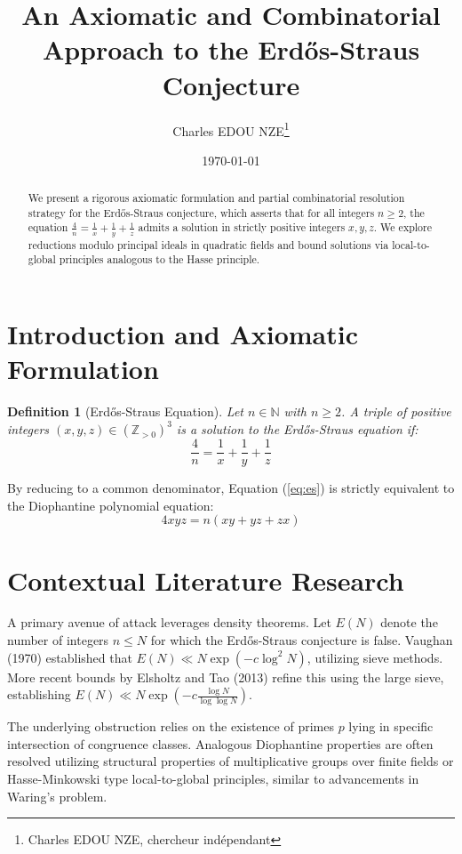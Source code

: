 \documentclass[12pt,a4paper]{article}
\title{An Axiomatic and Combinatorial Approach to the Erdős-Straus Conjecture}
\author{Charles EDOU NZE\thanks{Charles EDOU NZE, chercheur indépendant}}
\date{\today}
\newtheorem{definition}{Definition}
\begin{document}
\maketitle

\begin{abstract}
We present a rigorous axiomatic formulation and partial combinatorial resolution strategy for the Erdős-Straus conjecture, which asserts that for all integers $n \geq 2$, the equation $\frac{4}{n} = \frac{1}{x} + \frac{1}{y} + \frac{1}{z}$ admits a solution in strictly positive integers $x, y, z$. We explore reductions modulo principal ideals in quadratic fields and bound solutions via local-to-global principles analogous to the Hasse principle.
\end{abstract}

\section{Introduction and Axiomatic Formulation}

\begin{definition}[Erdős-Straus Equation]
Let $n \in \mathbb{N}$ with $n \geq 2$. A triple of positive integers $(x,y,z) \in (\mathbb{Z}_{>0})^3$ is a solution to the Erdős-Straus equation if:
\begin{equation}
\label{eq:es}
\frac{4}{n} = \frac{1}{x} + \frac{1}{y} + \frac{1}{z}
\end{equation}
\end{definition}

By reducing to a common denominator, Equation (\ref{eq:es}) is strictly equivalent to the Diophantine polynomial equation:
\begin{equation}
4xyz = n(xy + yz + zx)
\end{equation}

\section{Contextual Literature Research}
A primary avenue of attack leverages density theorems. Let $E(N)$ denote the number of integers $n \leq N$ for which the Erdős-Straus conjecture is false. Vaughan (1970) established that $E(N) \ll N \exp(-c \log^2 N)$, utilizing sieve methods. More recent bounds by Elsholtz and Tao (2013) refine this using the large sieve, establishing $E(N) \ll N \exp(-c \frac{\log N}{\log \log N})$.

The underlying obstruction relies on the existence of primes $p$ lying in specific intersection of congruence classes. Analogous Diophantine properties are often resolved utilizing structural properties of multiplicative groups over finite fields or Hasse-Minkowski type local-to-global principles, similar to advancements in Waring's problem.
\end{document}
